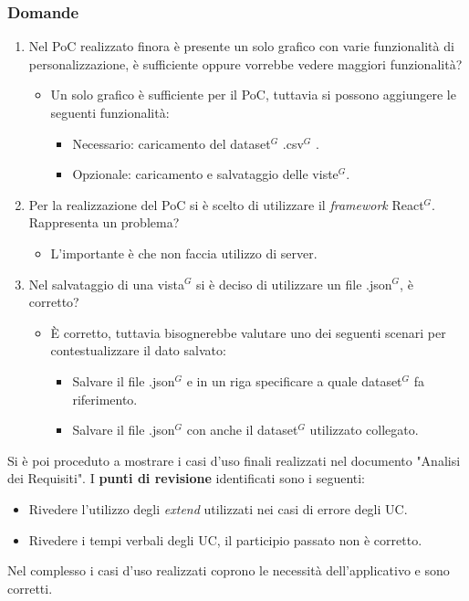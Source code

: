 \subsubsection{Domande}
\begin{enumerate}
	\item Nel PoC realizzato finora è presente un solo grafico con varie funzionalità di personalizzazione, è sufficiente oppure vorrebbe vedere maggiori funzionalità?
	\begin{itemize}
		\item Un solo grafico è sufficiente per il PoC, tuttavia si possono aggiungere le seguenti funzionalità:
		\begin{itemize}
			\item Necessario: caricamento del dataset$^{G}$ .csv$^{G}$ .
			\item Opzionale: caricamento e salvataggio delle viste$^{G}$.
		\end{itemize}
	\end{itemize}
	\item Per la realizzazione del PoC si è scelto di utilizzare il \textit{framework} React$^{G}$. Rappresenta un problema?
	\begin{itemize}
		\item L'importante è che non faccia utilizzo di server.
	\end{itemize}
	\item Nel salvataggio di una vista$^{G}$ si è deciso di utilizzare un file .json$^{G}$, è corretto?
	\begin{itemize}
		\item È corretto, tuttavia bisognerebbe valutare uno dei seguenti scenari per contestualizzare il dato salvato:
		\begin{itemize}
			\item Salvare il file .json$^{G}$ e in un riga specificare a quale dataset$^{G}$ fa riferimento.
			\item Salvare il file .json$^{G}$ con anche il dataset$^{G}$ utilizzato collegato.
		\end{itemize}
	\end{itemize}
\end{enumerate}

\noindent
Si è poi proceduto a mostrare i casi d'uso finali realizzati nel documento "Analisi dei Requisiti".
I \textbf{punti di revisione} identificati sono i seguenti:
\begin{itemize}
	\item Rivedere l'utilizzo degli \textit{extend} utilizzati nei casi di errore degli UC.
	\item Rivedere i tempi verbali degli UC, il participio passato non è corretto.
\end{itemize}
Nel complesso i casi d'uso realizzati coprono le necessità dell'applicativo e sono corretti.

